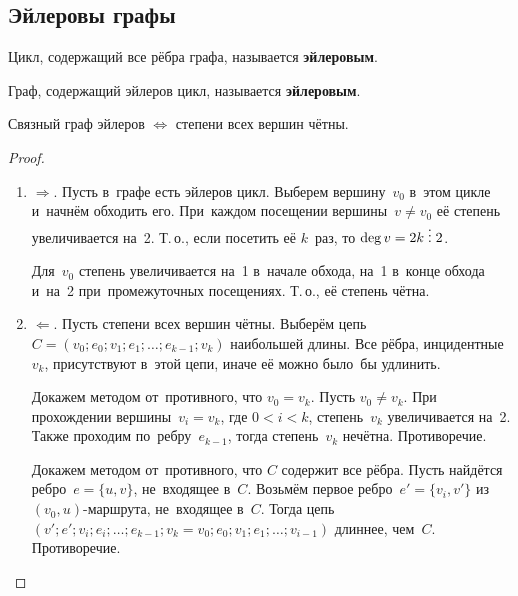 \subsection{Эйлеровы графы}
Цикл, содержащий все рёбра графа, называется \textbf{эйлеровым}.

Граф, содержащий эйлеров цикл, называется \textbf{эйлеровым}.

\begin{theorem}
Связный граф эйлеров $\Leftrightarrow$ степени всех вершин чётны.
\end{theorem}
\begin{proof}
\begin{enumerate}
	\item $\Rightarrow$. Пусть в~графе есть эйлеров цикл.
	Выберем вершину~$v_0$ в~этом цикле и~начнём обходить его.
	При~каждом посещении вершины~$v \neq v_0$ её степень увеличивается на~2.
	Т.\,о., если посетить её $k$~раз, то $\deg v = 2k \;\vdots\; 2$.
	
	Для~$v_0$ степень увеличивается на~1 в~начале обхода, на~1 в~конце обхода и~на~2 при~промежуточных посещениях.
	Т.\,о., её степень чётна.
	
	\item $\Leftarrow$. Пусть степени всех вершин чётны.
	Выберём цепь~$C = (v_0; e_0; v_1; e_1; \ldots; e_{k-1}; v_k)$ наибольшей длины.
	Все рёбра, инцидентные~$v_k$, присутствуют в~этой цепи, иначе её можно было~бы удлинить.
	
	Докажем методом от~противного, что $v_0 = v_k$.
	Пусть $v_0 \neq v_k$.
	При прохождении вершины~$v_i = v_k$, где $0 < i < k$, степень~$v_k$ увеличивается на~2.
	Также проходим по~ребру~$e_{k-1}$, тогда степень~$v_k$ нечётна.
	Противоречие.
	
	Докажем методом от~противного, что $C$ содержит все рёбра.	
	Пусть найдётся ребро~$e = \{ u, v \}$, не~входящее в~$C$.
	Возьмём первое ребро~$e' = \{ v_i, v' \}$ из~$(v_0, u)$\nobreakdash-\hspace{0pt}маршрута, не~входящее в~$C$.
	Тогда цепь~$(v'; e'; v_i; e_i; \ldots; e_{k-1}; v_k = v_0; e_0; v_1; e_1; \ldots; v_{i-1})$ длиннее, чем~$C$.
	Противоречие.
\end{enumerate}
\end{proof}


